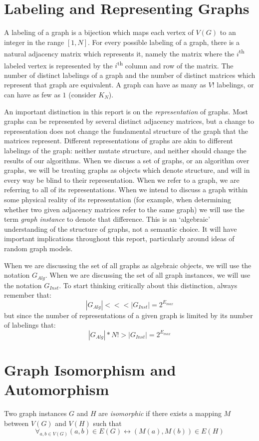 \documentclass[11pt,a4paper]{report}
\newcommand{\ts}{\textsuperscript}
\begin{document}
\section{Labeling and Representing Graphs}

A labeling of a graph is a bijection which maps each vertex of $V(G)$ to an integer in the range $[1, N]$.
For every possible labeling of a graph, there is a natural adjacency matrix which represents it, namely the matrix where the $i$\ts{th} labeled vertex is represented by the $i$\ts{th} column and row of the matrix.
The number of distinct labelings of a graph and the number of distinct matrices which represent that graph are equivalent.
A graph can have as many as $V!$ labelings, or can have as few as $1$ (consider $K_N$).

An important distinction in this report is on the \emph{representation} of graphs.
Most graphs can be represented by several distinct adjacency matrices, but a change to representation does not change the fundamental structure of the graph that the matrices represent.
Different representations of graphs are akin to different labelings of the graph: neither mutate structure, and neither should change the results of our algorithms.
When we discuss a set of graphs, or an algorithm over graphs, we will be treating graphs as objects which denote structure, and will in every way be blind to their representation.
When we refer to a graph, we are referring to all of its representations.
When we intend to discuss a graph within some physical reality of its representation (for example, when determining whether two given adjacency matrices refer to the same graph) we will use the term \emph{graph instance} to denote that difference.
This is an `algebraic' understanding of the structure of graphs, not a semantic choice. 
It will have important implications throughout this report, particularly around ideas of random graph models.

When we are discussing the set of all graphs as algebraic objects, we will use the notation $G_{Alg}$.
When we are discussing the set of all graph instances, we will use the notation $G_{Inst}$.
To start thinking critically about this distinction, always remember that:
$$|G_{Alg}| <<< |G_{Inst}| = 2^{E_{max}}$$
but since the number of representations of a given graph is limited by its number of labelings that:
$$|G_{Alg}| * N! > | G_{Inst} | =  2^{E_{max}}$$


\section{Graph Isomorphism and Automorphism}
Two graph instances $G$ and $H$ are \emph{isomorphic} if there exists a mapping $M$ between $V(G)$ and $V(H)$ such that $$\forall_{a, b \in V(G)} (a, b) \in E(G) \leftrightarrow (M(a), M(b)) \in E(H)$$
\end{document}
